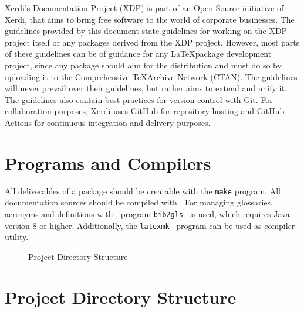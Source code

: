 \documentclass{xdpdoc}
\begin{document}
    Xerdi's Documentation Project (XDP) is part of an Open Source initiative of Xerdi, that aims to bring free software to the world of corporate businesses.
    The guidelines provided by this document state guidelines for working on the XDP project itself or any packages derived from the XDP project.
    However, most parts of these guidelines can be of guidance for any \LaTeX package development project, since any package should aim for the \TeXLive distribution and must do so by uploading it to the Comprehensive \TeX Archive Network (CTAN).
    The guidelines will never prevail over their guidelines, but rather aims to extend and unify it.
    The guidelines also contain best practices for version control with Git.
    For collaboration purposes, Xerdi uses GitHub for repository hosting and GitHub Actions for continuous integration and delivery purposes.

    \section{Programs and Compilers}

    All deliverables of a package should be creatable with the \texttt{make} program.
    All documentation sources should be compiled with \LuaLaTeX.
    For managing glossaries, acronyms and definitions with \BibTeX, program \texttt{bib2gls}~\cite{bib2gls} is used, which requires Java version 8 or higher.
    Additionally, the \texttt{latexmk}~\cite{latexmk} program can be used as compiler utility.


    \begin{wrapfigure}{r}{7cm}
        \vspace*{-1.1cm}%
        \caption{Project Directory Structure}\label{fig:project dir}
        \vspace{-5pt}
    \end{wrapfigure}


    \section{Project Directory Structure}\label{sec:pds}
\end{document}
